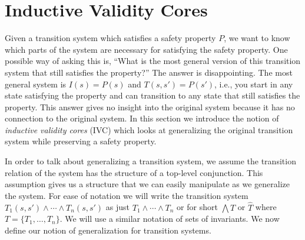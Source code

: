 \section{Inductive Validity Cores}
\label{sec:support}

\newcommand{\bq}{\textsc{BaseQuery}\xspace}
\newcommand{\iq}{\textsc{InductiveQuery}\xspace}
\newcommand{\fq}{\textsc{FullQuery}\xspace}

\newcommand{\mink}{\textsc{MinimizeK}\xspace}
\newcommand{\reduceinv}{\textsc{ReduceInvariants}\xspace}
\newcommand{\minsupport}{\textsc{MinimizeSupport}\xspace}

\newcommand{\checksat}{\textsc{CheckSat}\xspace}
\newcommand{\unsatcore}{\textsc{UnsatCore}\xspace}
\newcommand{\unsat}{\textsc{UNSAT}\xspace}
\newcommand{\sat}{\textsc{SAT}\xspace}

Given a transition system which satisfies a safety property $P$, we
want to know which parts of the system are necessary for satisfying
the safety property. One possible way of asking this is, ``What is the
most general version of this transition system that still satisfies
the property?'' The answer is disappointing. The most general system is
$I(s) = P(s)$ and $T(s, s') = P(s')$, i.e., you start in any state
satisfying the property and can transition to any state that still
satisfies the property. This answer gives no insight into the original
system because it has no connection to the original system. In this
section we introduce the notion of {\em inductive validity cores} (IVC) 
which looks at generalizing the original transition system while 
preserving a safety property.

In order to talk about generalizing a transition system, we assume the
transition relation of the system has the structure of a top-level
conjunction. This assumption gives us a structure that we can easily
manipulate as we generalize the system. For ease of notation we will
write the transition system $T_1(s, s') \land \cdots \land T_n(s, s')$
as just $T_1 \land \cdots \land T_n$ or for short $\bigwedge T$ or %
$\widehat T$ where $T = \{T_1, \ldots, T_n\}$.  We will use a similar
notation of sets of invariants. We now define our notion of
generalization for transition systems.

  
